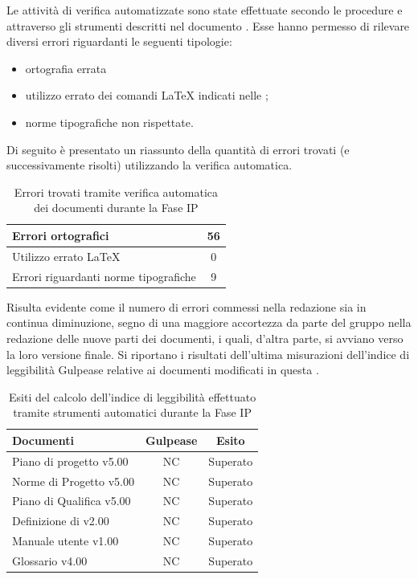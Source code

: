 	Le attività di verifica automatizzate sono state effettuate secondo le procedure e attraverso gli strumenti descritti nel documento . Esse hanno permesso di rilevare diversi errori riguardanti le seguenti tipologie:
	\begin{itemize}
	\item ortografia errata
	\item utilizzo errato dei comandi \LaTeX{} indicati nelle ;
	\item norme tipografiche non rispettate.
	\end{itemize}
	Di seguito è presentato un riassunto della quantità di errori trovati (e successivamente risolti) utilizzando la verifica automatica.
	\begin{table}[H]
		\centering
			\begin{tabu}{| l | c |}
				\hline
				Errori ortografici	& 56	\\ \hline
				Utilizzo errato \LaTeX{}	& 0	\\ \hline
				Errori riguardanti norme tipografiche	& 9	\\ \hline
			\end{tabu}
		\caption{Errori trovati tramite verifica automatica dei documenti durante la Fase IP}
	\end{table}

	Risulta evidente come il numero di errori commessi nella redazione sia in continua diminuzione, segno di una maggiore accortezza da parte del gruppo nella redazione delle nuove parti dei documenti, i quali, d'altra parte, si avviano verso la loro versione finale.
	Si riportano i risultati dell'ultima misurazioni dell'indice di leggibilità Gulpease relative ai documenti modificati in questa .

	\begin{table}[H]
		\centering
			\begin{tabu}{| l | c | c |}
				\hline
				Documenti 							& Gulpease	& Esito		\\ \hline \hline
				Piano di progetto v5.00				& NC 		& Superato  \\ \hline
				Norme di Progetto v5.00 			& NC		& Superato  \\ \hline
				Piano di Qualifica v5.00 			& NC		& Superato  \\ \hline
				Definizione di  v2.00		& NC		& Superato \\ \hline
				Manuale utente v1.00				& NC		& Superato \\ \hline
				Glossario v4.00					 	& NC 		& Superato  \\ \hline
			\end{tabu}
		\caption{Esiti del calcolo dell'indice di leggibilità effettuato tramite strumenti automatici durante la Fase IP}
	\end{table}

